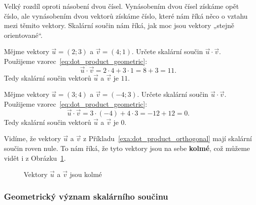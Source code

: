 Velký rozdíl oproti násobení dvou čísel. Vynásobením dvou čísel získáme opět číslo,
ale vynásobením dvou vektorů získáme číslo, které nám říká něco o vztahu mezi těmito vektory.
Skalární součin nám říká, jak moc jsou vektory „stejně orientované“.


\begin{example}
    Mějme vektory $\vec{u} = (2; 3)$ a $\vec{v} = (4; 1)$. Určete skalární součin $\vec{u} \cdot \vec{v}$.
    Použijeme vzorec~\eqref{eq:dot_product_geometric}:
    \[
    \vec{u} \cdot \vec{v} = 2 \cdot 4 + 3 \cdot 1 = 8 + 3 = 11.
    \]
    Tedy skalární součin vektorů $\vec{u}$ a $\vec{v}$ je $11$.
\end{example}

\begin{example}\label{exa:dot_product_orthogonal}
    Mějme vektory $\vec{u} = (3;4)$ a $\vec{v} = (-4;3)$. Určete skalární součin $\vec{u} \cdot \vec{v}$.
    Použijeme vzorec~\eqref{eq:dot_product_geometric}:
    \[
    \vec{u} \cdot \vec{v} = 3 \cdot (-4) + 4 \cdot 3 = -12 + 12 = 0.
    \]
    Tedy skalární součin vektorů $\vec{u}$ a $\vec{v}$ je $0$.
\end{example}

Vidíme, že vektory $\vec{u}$ a $\vec{v}$ z Příkladu~\ref{exa:dot_product_orthogonal}
mají skalární součin roven nule. To nám říká, že tyto vektory jsou na sebe \textbf{kolmé}, 
což můžeme vidět i z Obrázku~\ref{fig:dot_product_orthogonal_example}.

\begin{figure}[H]
    \centering
    \caption{Vektory $\vec{u}$ a $\vec{v}$ jsou kolmé}
    \label{fig:dot_product_orthogonal_example}
\end{figure}

\subsubsection{Geometrický význam skalárního součinu}\label{subsubsec:Geometric_meaning_of_dot_product}

